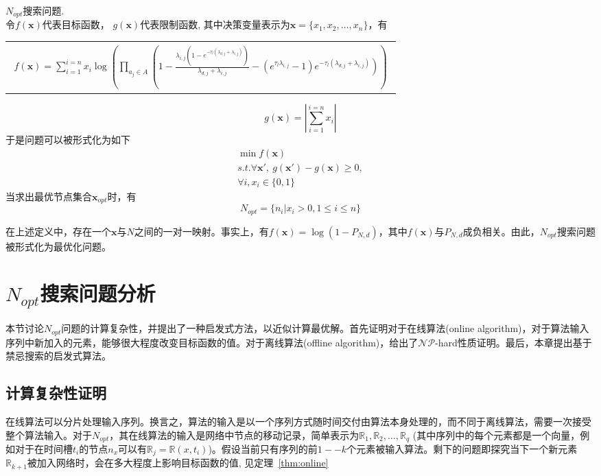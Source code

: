 \begin{definition}$N_{opt}$搜索问题.\\
令$f(\mathbf{x})$代表目标函数， $g(\mathbf{x})$代表限制函数, 其中决策变量表示为$\mathbf{x}=\{x_1,x_2,\ldots,x_n\}$，有 
\begin{tabular}{l}
\parbox{\linewidth}{
\begin{multline*}
f(\mathbf{x})=\sum_{i=1}^{i=n}x_i\log\left(\prod_{a_j\in A}\left(1-\frac{\lambda _{i,j} \left(1-e^{-\tau _l \left(\lambda _{d,j}+\lambda _{i,j}\right)}\right)}{\lambda _{d,j}+\lambda _{i,j}}\right.-\left.\left(e^{\tau _l \lambda _{i,j}}-1\right) e^{-\tau _l \left(\lambda _{d,j}+\lambda _{i,j}\right)}\right)\right)
\end{multline*}
}
\end{tabular}
\[
g(\mathbf{x})=\left|\sum_{i=1}^{i=n}x_i\right|
\]
于是问题可以被形式化为如下
\[
\begin{array}{c}
\min f(\mathbf{x}) \\
s.t.\forall\mathbf{x'},~g(\mathbf{x'})-g(\mathbf{x})\geq 0, \\
\forall i,x_i\in \{0,1\}
\end{array} 
\]
当求出最优节点集合$\mathbf{x}_{opt}$时，有
\[
N_{opt}=\{n_i|x_i>0,1\leq i\leq n\}
\]
\label{def:N_opt}
\end{definition}

在上述定义中，存在一个$\bm{x}$与$N$之间的一对一映射。事实上，有$f(\bm{x})=\log(1-P_{N,d})$，其中$f(\bm{x})$与$P_{N,d}$成负相关。由此，$N_{opt}$搜索问题被形式化为最优化问题。

\section{$N_{opt}$搜索问题分析}
\label{chap3:搜索问题分析}

本节讨论$N_{opt}$问题的计算复杂性，并提出了一种启发式方法，以近似计算最优解。首先证明对于在线算法(online algorithm)，对于算法输入序列中新加入的元素，能够很大程度改变目标函数的值。对于离线算法(offline algorithm)，给出了$\mathcal{NP}$-hard性质证明。最后，本章提出基于禁忌搜索的启发式算法。

\subsection{计算复杂性证明}
在线算法可以分片处理输入序列。换言之，算法的输入是以一个序列方式随时间交付由算法本身处理的，而不同于离线算法，需要一次接受整个算法输入。对于$N_{opt}$，其在线算法的输入是网络中节点的移动记录，简单表示为$\mathbb{R}_{1},\mathbb{R}_{2},\ldots,\mathbb{R}_{q}$ (其中序列中的每个元素都是一个向量，例如对于在时间槽$t_i$的节点$n_x$可以有$\mathbb{R}_j=\mathbb{R}(x,t_i)$)。假设当前只有序列的前$1--k$个元素被输入算法。剩下的问题即探究当下一个新元素$\mathbb{R}_{k+1}$被加入网络时，会在多大程度上影响目标函数的值, 见定理~\ref{thm:online}

